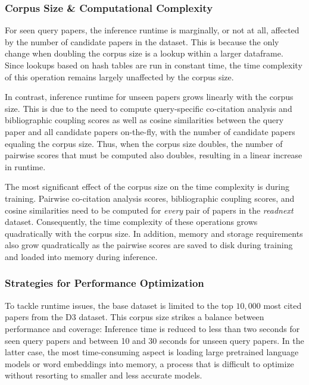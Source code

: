 \subsubsection*{Corpus Size \& Computational Complexity}

For seen query papers, the inference runtime is marginally, or not at all, affected by the number of candidate papers in the dataset. This is because the only change when doubling the corpus size is a lookup within a larger dataframe. Since lookups based on hash tables are run in constant time, the time complexity of this operation remains largely unaffected by the corpus size.

In contrast, inference runtime for unseen papers grows linearly with the corpus size. This is due to the need to compute query-specific co-citation analysis and bibliographic coupling scores as well as cosine similarities between the query paper and all candidate papers on-the-fly, with the number of candidate papers equaling the corpus size.
Thus, when the corpus size doubles, the number of pairwise scores that must be computed also doubles, resulting in a linear increase in runtime.

The most significant effect of the corpus size on the time complexity is during training.
Pairwise co-citation analysis scores, bibliographic coupling scores, and cosine similarities need to be computed for \emph{every} pair of papers in the \emph{readnext} dataset. Consequently, the time complexity of these operations grows quadratically with the corpus size.
In addition, memory and storage requirements also grow quadratically as the pairwise scores are saved to disk during training and loaded into memory during inference.


\subsubsection*{Strategies for Performance Optimization}

To tackle runtime issues, the base dataset is limited to the top $10,000$ most cited papers from the D3 dataset.
This corpus size strikes a balance between performance and coverage:
Inference time is reduced to less than two seconds for seen query papers and between 10 and 30 seconds for unseen query papers. In the latter case, the most time-consuming aspect is loading large pretrained language models or word embeddings into memory, a process that is difficult to optimize without resorting to smaller and less accurate models.

